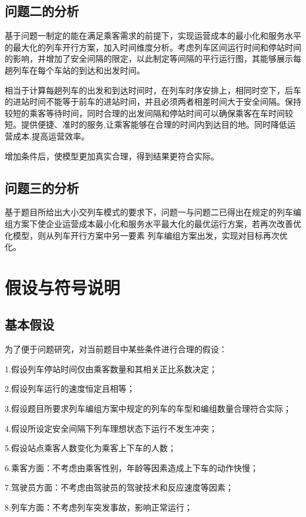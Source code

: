 \documentclass[UTF8]{ctexart}
\begin{document}
\subsection{问题二的分析}
基于问题一制定的能在满足乘客需求的前提下，实现运营成本的最小化和服务水平的最大化的列车开行方案，加入时间维度分析。考虑列车区间运行时间和停站时间的影响，并增加了安全间隔的限定，以此制定等间隔的平行运行图，其能够展示每趟列车在每个车站的到达和出发时间。\par 
相当于计算每趟列车的出发和到达时间时，在列车时序安排上，相同时空下，后车的进站时间不能等于前车的进站时间，并且必须两者相差时间大于安全间隔。保持较短的乘客等待时间，同时合理的出发间隔和停站时间可以确保乘客在车时间较短。提供便捷、准时的服务,让乘客能够在合理的时间内到达目的地。同时降低运营成本,提高运营效率。\par 
增加条件后，使模型更加真实合理，得到结果更符合实际。\par 
\subsection{问题三的分析}
基于题目所给出大小交列车模式的要求下，问题一与问题二已得出在规定的列车编组方案下使企业运营成本最小化和服务水平最大化的最优运行方案，若再次改善优化模型，则从列车开行方案中另一要素 列车编组方案出发，实现对目标再次优化。\par
\section{假设与符号说明}
\subsection{基本假设}
为了便于问题研究，对当前题目中某些条件进行合理的假设：\par
1.假设列车停站时间仅由乘客数量和其相关正比系数决定；\par
2.假设列车运行的速度恒定且相等；\par
3.假设题目所要求列车编组方案中规定的列车的车型和编组数量合理符合实际；\par
4.假设所设定安全间隔下列车理想状态下运行不发生冲突；\par
5.假设站点乘客人数变化为乘客上下车的人数；\par
6.乘客方面：不考虑由乘客性别，年龄等因素造成上下车的动作快慢；\par
7.驾驶员方面：不考虑由驾驶员的驾驶技术和反应速度等因素；\par
8.列车方面：不考虑列车突发事故，影响正常运行；\par
\end{document}
